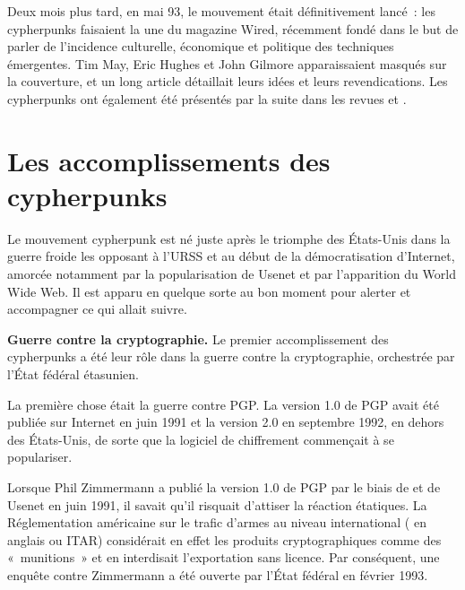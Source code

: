 Deux mois plus tard, en mai 93, le mouvement était définitivement lancé~: les cypherpunks faisaient la une du magazine Wired, récemment fondé dans le but de parler de l'incidence culturelle, économique et politique des techniques émergentes. Tim May, Eric Hughes et John Gilmore apparaissaient masqués sur la couverture, et un long article détaillait leurs idées et leurs revendications. Les cypherpunks ont également été présentés par la suite dans les revues  et .

\section*{Les accomplissements des cypherpunks}

Le mouvement cypherpunk est né juste après le triomphe des États-Unis dans la guerre froide les opposant à l'URSS et au début de la démocratisation d'Internet, amorcée notamment par la popularisation de Usenet et par l'apparition du World Wide Web. Il est apparu en quelque sorte au bon moment pour alerter et accompagner ce qui allait suivre.


\textbf{Guerre contre la cryptographie.} Le premier accomplissement des cypherpunks a été leur rôle dans la guerre contre la cryptographie, orchestrée par l'État fédéral étasunien.

La première chose était la guerre contre PGP. La version 1.0 de PGP avait été publiée sur Internet en juin 1991 et la version 2.0 en septembre 1992, en dehors des États-Unis, de sorte que la logiciel de chiffrement commençait à se populariser.

Lorsque Phil Zimmermann a publié la version 1.0 de PGP par le biais de  et de Usenet en juin 1991, il savait qu'il risquait d'attiser la réaction étatiques. La Réglementation américaine sur le trafic d'armes au niveau international ( en anglais ou ITAR) considérait en effet les produits cryptographiques comme des «~munitions~» et en interdisait l'exportation sans licence. Par conséquent, une enquête contre Zimmermann a été ouverte par l'État fédéral en février 1993.

